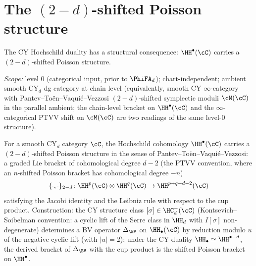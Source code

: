 \section{The \texorpdfstring{$(2-d)$}{(2-d)}-shifted Poisson structure}
\label{sec:shifted-poisson}

The CY Hochschild duality has a structural consequence: $\HH^\bullet(\cC)$
carries a $(2-d)$-shifted Poisson structure.

\begin{theorem}
\label{thm:shifted-poisson}
\textsl{Scope:} level $0$ (categorical input, prior to $\PhiFA_d$);
chart-independent; ambient smooth CY$_d$ dg category at chain level
(equivalently, smooth CY $\infty$-category with
Pantev--To\"en--Vaqui\'e--Vezzosi $(2-d)$-shifted symplectic moduli
$\cM(\cC)$ in the parallel ambient; the chain-level bracket on
$\HH^\bullet(\cC)$ and the $\infty$-categorical PTVV shift on
$\cM(\cC)$ are two readings of the same level-$0$ structure).

For a smooth CY$_d$ category $\cC$, the Hochschild cohomology
$\HH^\bullet(\cC)$ carries a $(2-d)$-shifted Poisson structure in the sense of Pantev--To\"en--Vaqui\'e--Vezzosi: a graded Lie bracket of cohomological degree $d-2$ (the PTVV convention, where an $n$-shifted Poisson bracket has cohomological degree $-n$)
\[
 \{\cdot, \cdot\}_{2-d}
 \colon \HH^p(\cC) \otimes \HH^q(\cC)
 \to \HH^{p+q+d-2}(\cC)
\]
satisfying the Jacobi identity and the Leibniz rule with respect
to the cup product. Construction: the CY structure class $[\sigma] \in \HC^-_d(\cC)$ (Kontsevich--Soibelman convention: a cyclic lift of the Serre class in $\HH_d$ with $I[\sigma]$ non-degenerate) determines a BV operator $\Delta_{\BV}$ on $\HH_\bullet(\cC)$ by reduction modulo $u$ of the negative-cyclic lift (with $|u|=2$); under the CY duality $\HH_\bullet \simeq \HH^{\bullet - d}$, the derived bracket of $\Delta_{\BV}$ with the cup product is the shifted Poisson bracket on $\HH^\bullet$.
\end{theorem}

